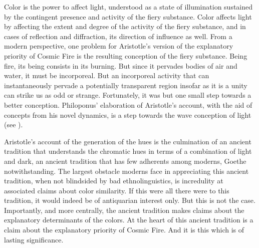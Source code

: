 Color is the power to affect light, understood as a state of illumination sustained by the contingent presence and activity of the fiery substance. Color affects light by affecting the extent and degree of the activity of the fiery substance, and in cases of reflection and diffraction, its direction of influence as well. From a modern perspective, one problem for Aristotle's version of the explanatory priority of Cosmic Fire is the resulting conception of the fiery substance. Being fire, its being consists in its burning. But since it pervades bodies of air and water, it must be incorporeal. But an incorporeal activity that can instantaneously pervade a potentially transparent region insofar as it is a unity can strike us as odd or strange. Fortunately, it was but one small step towards a better conception. Philoponus' elaboration of Aristotle's account, with the aid of concepts from his novel dynamics, is a step towards the wave conception of light (see \citealt{Wolff:1987vn}).

Aristotle's account of the generation of the hues is the culmination of an ancient tradition that understands the chromatic hues in terms of a combination of light and dark, an ancient tradition that has few adherents among moderns, Goethe notwithstanding. The largest obstacle moderns face in appreciating this ancient tradition, when not blindsided by bad ethnolinguistics, is incredulity at associated claims about color similarity. If this were all there were to this tradition, it would indeed be of antiquarian interest only. But this is not the case. Importantly, and more centrally, the ancient tradition makes claims about the explanatory determinants of the colors. At the heart of this ancient tradition is a claim about the explanatory priority of Cosmic Fire. And it is this which is of lasting significance. 


